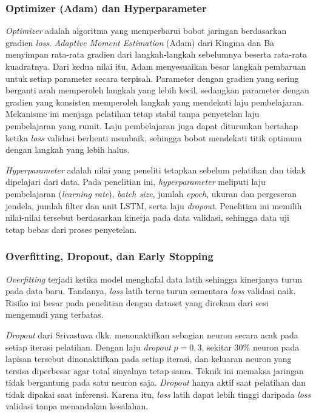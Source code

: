 \subsubsection{Optimizer (Adam) dan Hyperparameter}
\textit{Optimizer} adalah algoritma yang memperbarui bobot jaringan berdasarkan gradien \textit{loss}. \textit{Adaptive Moment Estimation} (Adam) dari Kingma dan Ba menyimpan rata-rata gradien dari langkah-langkah sebelumnya beserta rata-rata kuadratnya. Dari kedua nilai itu, Adam menyesuaikan besar langkah pembaruan untuk setiap parameter secara terpisah. Parameter dengan gradien yang sering berganti arah memperoleh langkah yang lebih kecil, sedangkan parameter dengan gradien yang konsisten memperoleh langkah yang mendekati laju pembelajaran. Mekanisme ini menjaga pelatihan tetap stabil tanpa penyetelan laju pembelajaran yang rumit. Laju pembelajaran juga dapat diturunkan bertahap ketika \textit{loss} validasi berhenti membaik, sehingga bobot mendekati titik optimum dengan langkah yang lebih halus.

\textit{Hyperparameter} adalah nilai yang peneliti tetapkan sebelum pelatihan dan tidak dipelajari dari data. Pada penelitian ini, \textit{hyperparameter} meliputi laju pembelajaran (\textit{learning rate}), \textit{batch size}, jumlah \textit{epoch}, ukuran dan pergeseran jendela, jumlah filter dan unit LSTM, serta laju \textit{dropout}. Penelitian ini memilih nilai-nilai tersebut berdasarkan kinerja pada data validasi, sehingga data uji tetap bebas dari proses penyetelan.

\subsubsection{Overfitting, Dropout, dan Early Stopping}
\textit{Overfitting} terjadi ketika model menghafal data latih sehingga kinerjanya turun pada data baru. Tandanya, \textit{loss} latih terus turun sementara \textit{loss} validasi naik. Risiko ini besar pada penelitian dengan dataset yang direkam dari sesi mengemudi yang terbatas.

\textit{Dropout} dari Srivastava dkk. menonaktifkan sebagian neuron secara acak pada setiap iterasi pelatihan. Dengan laju \textit{dropout} $p = 0{,}3$, sekitar 30\% neuron pada lapisan tersebut dinonaktifkan pada setiap iterasi, dan keluaran neuron yang tersisa diperbesar agar total sinyalnya tetap sama. Teknik ini memaksa jaringan tidak bergantung pada satu neuron saja. \textit{Dropout} hanya aktif saat pelatihan dan tidak dipakai saat inferensi. Karena itu, \textit{loss} latih dapat lebih tinggi daripada \textit{loss} validasi tanpa menandakan kesalahan.


